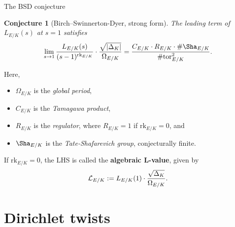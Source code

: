 \documentclass[10pt]{beamer}
\newtheorem{conjecture}{Conjecture}
\begin{document}
\begin{frame}[t]{The BSD conjecture}

\begin{conjecture}[Birch--Swinnerton-Dyer, strong form]
The leading term of $ L_{E / K}(s) $ at $ s = 1 $ satisfies
\vspace{-0.2cm} $$ \vspace{-0.2cm} \lim_{s \to 1} \dfrac{L_{E / K}(s)}{(s - 1)^{\mathrm{rk}_{E / K}}} \cdot \dfrac{\sqrt{|\Delta_K|}}{\Omega_{E / K}} = \dfrac{C_{E / K} \cdot R_{E / K} \cdot \#\Sha_{E / K}}{\#\mathrm{tor}_{E / K}^2}. $$
\end{conjecture}

\pause

\vspace{-0.2cm} Here,
\begin{itemize}
\item $ \Omega_{E / K}$ is the \emph{global period},
\item $ C_{E / K} $ is the \emph{Tamagawa product},
\item $ R_{E / K} $ is the \emph{regulator}, where $ R_{E / K} = 1 $ if $ \mathrm{rk}_{E / K} = 0 $, and
\item $ \Sha_{E / K} $ is the \emph{Tate-Shafarevich group}, conjecturally finite.
\end{itemize}

\pause

\vspace{0.5cm} If $ \mathrm{rk}_{E / K} = 0 $, the LHS is called the \textbf{algebraic L-value}, given by
\vspace{-0.2cm} $$ \vspace{-0.2cm} \mathcal{L}_{E / K} := L_{E / K}(1) \cdot \dfrac{\sqrt{\Delta_K}}{\Omega_{E / K}}. $$

\end{frame}

\section{Dirichlet twists}
\end{document}
